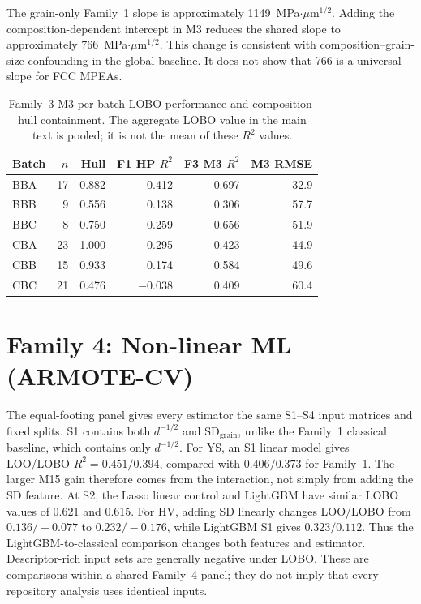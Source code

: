 \documentclass[a4paper,11pt]{article}
\newcommand{\familyfour}{Non-linear ML (ARMOTE-CV)}
\begin{document}
The grain-only Family~1 slope is approximately 1149~MPa$\cdot\mu$m$^{1/2}$. Adding the composition-dependent intercept in M3 reduces the shared slope to approximately 766~MPa$\cdot\mu$m$^{1/2}$. This change is consistent with composition--grain-size confounding in the global baseline. It does not show that 766 is a universal slope for FCC MPEAs.

\begin{table}[H]
\centering
\caption{Family~3 M3 per-batch LOBO performance and composition-hull containment. The aggregate LOBO value in the main text is pooled; it is not the mean of these $R^2$ values.}
\label{tab:batch}
\small
\begin{tabular}{lrrrrr}
\toprule
Batch & $n$ & Hull & F1 HP $R^2$ & F3 M3 $R^2$ & M3 RMSE \\
\midrule
BBA & 17 & 0.882 & 0.412 & 0.697 & 32.9 \\
BBB & 9 & 0.556 & 0.138 & 0.306 & 57.7 \\
BBC & 8 & 0.750 & 0.259 & 0.656 & 51.9 \\
CBA & 23 & 1.000 & 0.295 & 0.423 & 44.9 \\
CBB & 15 & 0.933 & 0.174 & 0.584 & 49.6 \\
CBC & 21 & 0.476 & $-0.038$ & 0.409 & 60.4 \\
\bottomrule
\end{tabular}
\end{table}

\section{Family 4: \familyfour}
\label{si:ml}

The equal-footing panel gives every estimator the same S1--S4 input matrices and fixed splits. S1 contains both $d^{-1/2}$ and $\mathrm{SD}_{\mathrm{grain}}$, unlike the Family~1 classical baseline, which contains only $d^{-1/2}$. For YS, an S1 linear model gives LOO/LOBO $R^2=0.451/0.394$, compared with $0.406/0.373$ for Family~1. The larger M15 gain therefore comes from the interaction, not simply from adding the SD feature. At S2, the Lasso linear control and LightGBM have similar LOBO values of 0.621 and 0.615. For HV, adding SD linearly changes LOO/LOBO from $0.136/-0.077$ to $0.232/-0.176$, while LightGBM S1 gives $0.323/0.112$. Thus the LightGBM-to-classical comparison changes both features and estimator. Descriptor-rich input sets are generally negative under LOBO. These are comparisons within a shared Family~4 panel; they do not imply that every repository analysis uses identical inputs.
\end{document}
